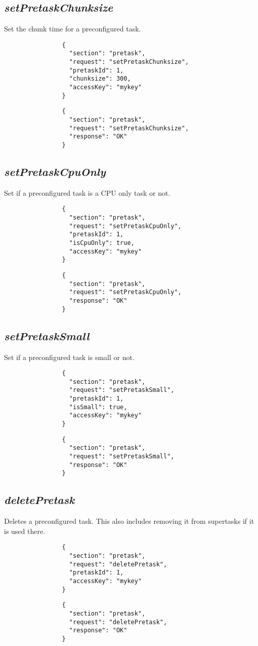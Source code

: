		\subsection*{\textit{setPretaskChunksize}}
			Set the chunk time for a preconfigured task.
			{
				\color{blue}
				\begin{verbatim}
				{
				  "section": "pretask",
				  "request": "setPretaskChunksize",
				  "pretaskId": 1,
				  "chunksize": 300,
				  "accessKey": "mykey"
				}
				\end{verbatim}
			}
			{
				\color{OliveGreen}
				\begin{verbatim}
				{
				  "section": "pretask",
				  "request": "setPretaskChunksize",
				  "response": "OK"
				}
				\end{verbatim}
			}
		\subsection*{\textit{setPretaskCpuOnly}}
			Set if a preconfigured task is a CPU only task or not.
			{
				\color{blue}
				\begin{verbatim}
				{
				  "section": "pretask",
				  "request": "setPretaskCpuOnly",
				  "pretaskId": 1,
				  "isCpuOnly": true,
				  "accessKey": "mykey"
				}
				\end{verbatim}
			}
			{
				\color{OliveGreen}
				\begin{verbatim}
				{
				  "section": "pretask",
				  "request": "setPretaskCpuOnly",
				  "response": "OK"
				}
				\end{verbatim}
			}
		\subsection*{\textit{setPretaskSmall}}
			Set if a preconfigured task is small or not.
			{
				\color{blue}
				\begin{verbatim}
				{
				  "section": "pretask",
				  "request": "setPretaskSmall",
				  "pretaskId": 1,
				  "isSmall": true,
				  "accessKey": "mykey"
				}
				\end{verbatim}
			}
			{
				\color{OliveGreen}
				\begin{verbatim}
				{
				  "section": "pretask",
				  "request": "setPretaskSmall",
				  "response": "OK"
				}
				\end{verbatim}
			}
		\subsection*{\textit{deletePretask}}
			Deletes a preconfigured task. This also includes removing it from supertasks if it is used there.
			{
				\color{blue}
				\begin{verbatim}
				{
				  "section": "pretask",
				  "request": "deletePretask",
				  "pretaskId": 1,
				  "accessKey": "mykey"
				}
				\end{verbatim}
			}
			{
				\color{OliveGreen}
				\begin{verbatim}
				{
				  "section": "pretask",
				  "request": "deletePretask",
				  "response": "OK"
				}
				\end{verbatim}
			}
